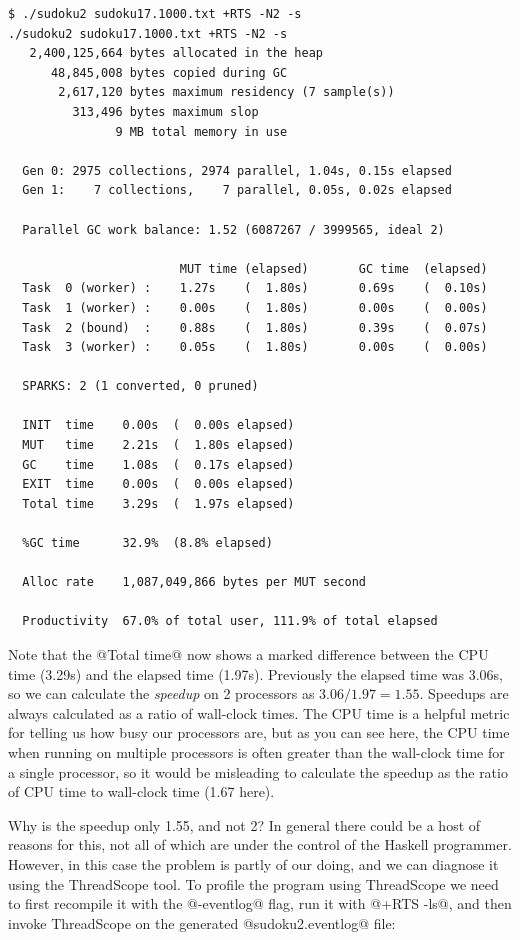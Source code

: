 {\small
\begin{verbatim}
$ ./sudoku2 sudoku17.1000.txt +RTS -N2 -s
./sudoku2 sudoku17.1000.txt +RTS -N2 -s 
   2,400,125,664 bytes allocated in the heap
      48,845,008 bytes copied during GC
       2,617,120 bytes maximum residency (7 sample(s))
         313,496 bytes maximum slop
               9 MB total memory in use

  Gen 0: 2975 collections, 2974 parallel, 1.04s, 0.15s elapsed
  Gen 1:    7 collections,    7 parallel, 0.05s, 0.02s elapsed

  Parallel GC work balance: 1.52 (6087267 / 3999565, ideal 2)

                        MUT time (elapsed)       GC time  (elapsed)
  Task  0 (worker) :    1.27s    (  1.80s)       0.69s    (  0.10s)
  Task  1 (worker) :    0.00s    (  1.80s)       0.00s    (  0.00s)
  Task  2 (bound)  :    0.88s    (  1.80s)       0.39s    (  0.07s)
  Task  3 (worker) :    0.05s    (  1.80s)       0.00s    (  0.00s)

  SPARKS: 2 (1 converted, 0 pruned)

  INIT  time    0.00s  (  0.00s elapsed)
  MUT   time    2.21s  (  1.80s elapsed)
  GC    time    1.08s  (  0.17s elapsed)
  EXIT  time    0.00s  (  0.00s elapsed)
  Total time    3.29s  (  1.97s elapsed)

  %GC time      32.9%  (8.8% elapsed)

  Alloc rate    1,087,049,866 bytes per MUT second

  Productivity  67.0% of total user, 111.9% of total elapsed
\end{verbatim}}

Note that the @Total time@ now shows a marked difference between the
CPU time (3.29s) and the elapsed time (1.97s).  Previously the elapsed
time was 3.06s, so we can calculate the \emph{speedup} on 2 processors
as $3.06/1.97 = 1.55$.  Speedups are always calculated as a ratio of
wall-clock times.  The CPU time is a helpful metric for telling us how
busy our processors are, but as you can see here, the CPU time when
running on multiple processors is often greater than the wall-clock
time for a single processor, so it would be misleading to calculate
the speedup as the ratio of CPU time to wall-clock time (1.67 here).

Why is the speedup only 1.55, and not 2?  In general there could be a
host of reasons for this, not all of which are under the control of
the Haskell programmer.  However, in this case the problem is partly
of our doing, and we can diagnose it using the ThreadScope tool.  To
profile the program using ThreadScope we need to first recompile it
with the @-eventlog@ flag, run it with @+RTS -ls@, and then invoke
ThreadScope on the generated @sudoku2.eventlog@ file:

